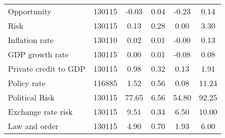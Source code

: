 \begin{table}[htbp]
\begin{tabular}{l*{1}{ccccc}}
Opportunity         &      130115&       -0.03&        0.04&       -0.23&        0.14\\
Risk                &      130115&        0.13&        0.28&        0.00&        3.30\\
Inflation rate      &      130110&        0.02&        0.01&       -0.00&        0.13\\
GDP growth rate     &      130115&        0.00&        0.01&       -0.08&        0.08\\
Private credit to GDP&      130115&        0.98&        0.32&        0.13&        1.91\\
Policy rate         &      116885&        1.52&        0.56&        0.08&       11.24\\
Political Risk      &      130115&       77.65&        6.56&       54.80&       92.25\\
Exchange rate risk  &      130115&        9.51&        0.34&        6.50&       10.00\\
Law and order       &      130115&        4.90&        0.70&        1.93&        6.00\\
\hline\hline
\end{tabular}
\end{table}
